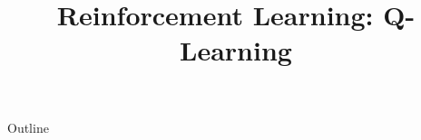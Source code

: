 \documentclass[xcolor=dvipsnames,compress,t,pdf,9pt]{beamer}
\title[\insertframenumber /\inserttotalframenumber]{Reinforcement Learning: Q-Learning}
\begin{document}
	\begin{frame}
	\titlepage
	\end{frame}

	\begin{frame}{Outline}
	    \tableofcontents
	\end{frame}

	
	
	
\end{document}
